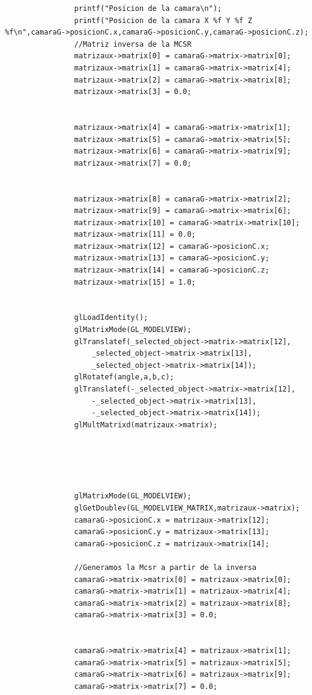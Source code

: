 \documentclass[12pt,a4paper]{article}
\begin{document}
\begin{enumerate}
\begin{lstlisting}
        		printf("Posicion de la camara\n");
        		printf("Posicion de la camara X %f Y %f Z %f\n",camaraG->posicionC.x,camaraG->posicionC.y,camaraG->posicionC.z);
        		//Matriz inversa de la MCSR
        		matrizaux->matrix[0] = camaraG->matrix->matrix[0];
				matrizaux->matrix[1] = camaraG->matrix->matrix[4];
				matrizaux->matrix[2] = camaraG->matrix->matrix[8];	
				matrizaux->matrix[3] = 0.0;

	
				matrizaux->matrix[4] = camaraG->matrix->matrix[1];
				matrizaux->matrix[5] = camaraG->matrix->matrix[5];	
				matrizaux->matrix[6] = camaraG->matrix->matrix[9];	
				matrizaux->matrix[7] = 0.0;
	
	
				matrizaux->matrix[8] = camaraG->matrix->matrix[2];	
				matrizaux->matrix[9] = camaraG->matrix->matrix[6];
				matrizaux->matrix[10] = camaraG->matrix->matrix[10];
				matrizaux->matrix[11] = 0.0;
				matrizaux->matrix[12] = camaraG->posicionC.x;
        		matrizaux->matrix[13] = camaraG->posicionC.y;
        		matrizaux->matrix[14] = camaraG->posicionC.z;
				matrizaux->matrix[15] = 1.0;
				
				
        		glLoadIdentity();
        		glMatrixMode(GL_MODELVIEW);
        		glTranslatef(_selected_object->matrix->matrix[12],
		    		_selected_object->matrix->matrix[13],
		    		_selected_object->matrix->matrix[14]);
		     	glRotatef(angle,a,b,c);
        		glTranslatef(-_selected_object->matrix->matrix[12],
		    		-_selected_object->matrix->matrix[13],
		    		-_selected_object->matrix->matrix[14]);
        		glMultMatrixd(matrizaux->matrix);
		    
        		

        		
        		
        		glMatrixMode(GL_MODELVIEW);
        		glGetDoublev(GL_MODELVIEW_MATRIX,matrizaux->matrix);
        		camaraG->posicionC.x = matrizaux->matrix[12];
        		camaraG->posicionC.y = matrizaux->matrix[13];
        		camaraG->posicionC.z = matrizaux->matrix[14];

				//Generamos la Mcsr a partir de la inversa
				camaraG->matrix->matrix[0] = matrizaux->matrix[0];
				camaraG->matrix->matrix[1] = matrizaux->matrix[4];
				camaraG->matrix->matrix[2] = matrizaux->matrix[8];	
				camaraG->matrix->matrix[3] = 0.0;

	
				camaraG->matrix->matrix[4] = matrizaux->matrix[1];
				camaraG->matrix->matrix[5] = matrizaux->matrix[5];	
				camaraG->matrix->matrix[6] = matrizaux->matrix[9];	
				camaraG->matrix->matrix[7] = 0.0;
	

\end{lstlisting}
\end{enumerate}
\end{document}
